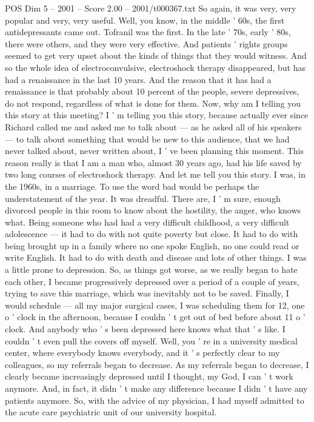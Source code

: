 \begin{textsample}{POS Dim 5 – 2001 – Score 2.00 – 2001/t000367.txt}
So again, it was very, very popular and very, very useful.
Well, you know, in the middle ' 60s, the first antidepressants came out.
Tofranil was the first.
In the late ' 70s, early ' 80s, there were others, and they were very effective.
And patients ' rights groups seemed to get very upset about the kinds of things that they would witness.
And so the whole idea of electroconvulsive, electroshock therapy disappeared, but has had a renaissance in the last 10 years.
And the reason that it has had a renaissance is that probably about 10 percent of the people, severe depressives, do not respond, regardless of what is done for them.
Now, why am I telling you this story at this meeting?
I ' m telling you this story, because actually ever since Richard called me and asked me to talk about — as he asked all of his speakers — to talk about something that would be new to this audience, that we had never talked about, never written about, I ' ve been planning this moment.
This reason really is that I am a man who, almost 30 years ago, had his life saved by two long courses of electroshock therapy.
And let me tell you this story.
I was, in the 1960s, in a marriage.
To use the word bad would be perhaps the understatement of the year.
It was dreadful.
There are, I ' m sure, enough divorced people in this room to know about the hostility, the anger, who knows what.
Being someone who had had a very difficult childhood, a very difficult adolescence — it had to do with not quite poverty but close.
It had to do with being brought up in a family where no one spoke English, no one could read or write English.
It had to do with death and disease and lots of other things.
I was a little prone to depression.
So, as things got worse, as we really began to hate each other, I became progressively depressed over a period of a couple of years, trying to save this marriage, which was inevitably not to be saved.
Finally, I would schedule — all my major surgical cases, I was scheduling them for 12, one o ' clock in the afternoon, because I couldn ' t get out of bed before about 11 o ' clock.
And anybody who ' s been depressed here knows what that ' s like.
I couldn ' t even pull the covers off myself.
Well, you ' re in a university medical center, where everybody knows everybody, and it ' s perfectly clear to my colleagues, so my referrals began to decrease.
As my referrals began to decrease, I clearly became increasingly depressed until I thought, my God, I can ' t work anymore.
And, in fact, it didn ' t make any difference because I didn ' t have any patients anymore.
So, with the advice of my physician, I had myself admitted to the acute care psychiatric unit of our university hospital.

\end{textsample}
